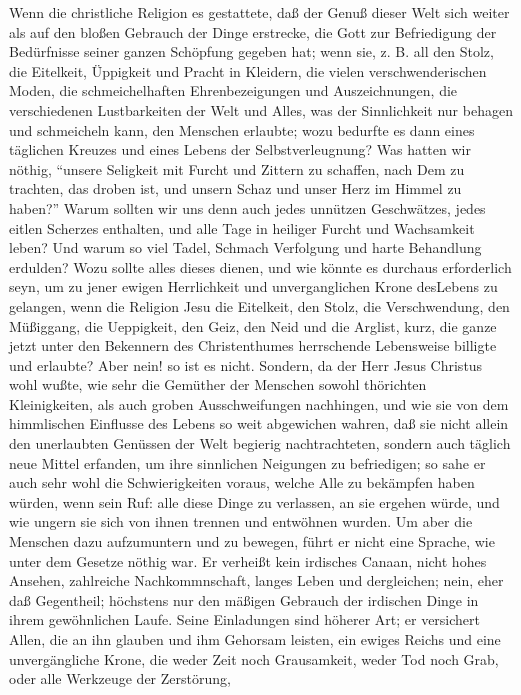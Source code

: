 Wenn die christliche Religion es gestattete, daß der Genuß dieser Welt sich
weiter als auf den bloßen Gebrauch der Dinge erstrecke, die Gott zur
Befriedigung der Bedürfnisse seiner ganzen Schöpfung gegeben hat; wenn sie, z.
B. all den Stolz, die Eitelkeit, Üppigkeit und Pracht in Kleidern, die vielen
verschwenderischen Moden, die schmeichelhaften Ehrenbezeigungen und
Auszeichnungen, die verschiedenen Lustbarkeiten der Welt und Alles, was der
Sinnlichkeit nur behagen und schmeicheln kann, den Menschen erlaubte; wozu
bedurfte es dann eines täglichen Kreuzes und eines Lebens der Selbstverleugnung?
Was hatten wir nöthig, "`unsere Seligkeit mit Furcht und Zittern zu schaffen,
nach Dem zu trachten, das droben ist, und unsern Schaz und unser Herz im Himmel
zu haben?"' Warum sollten wir uns denn auch jedes unnützen Geschwätzes, jedes
eitlen Scherzes enthalten, und alle Tage in heiliger Furcht und Wachsamkeit
leben? Und warum so viel Tadel, Schmach Verfolgung und harte Behandlung
erdulden? Wozu sollte alles dieses dienen, und wie könnte es durchaus
erforderlich seyn, um zu jener ewigen Herrlichkeit und unverganglichen Krone
desLebens zu gelangen, wenn die Religion Jesu die Eitelkeit, den Stolz, die
Verschwendung, den Müßiggang, die Ueppigkeit, den Geiz, den Neid und die
Arglist, kurz, die ganze jetzt unter den Bekennern des Christenthumes
herrschende Lebensweise billigte und erlaubte? Aber nein! so ist es nicht.
Sondern, da der Herr Jesus Christus wohl wußte, wie sehr die Gemüther der
Menschen sowohl thörichten Kleinigkeiten, als auch groben Ausschweifungen
nachhingen, und wie sie von dem himmlischen Einflusse des Lebens so weit
abgewichen wahren, daß sie nicht allein den unerlaubten Genüssen der Welt
begierig nachtrachteten, sondern auch täglich neue Mittel erfanden, um ihre
sinnlichen Neigungen zu befriedigen; so sahe er auch sehr wohl die
Schwierigkeiten voraus, welche Alle zu bekämpfen haben würden, wenn sein Ruf:
alle diese Dinge zu verlassen, an sie ergehen würde, und wie ungern sie sich von
ihnen trennen und entwöhnen wurden. Um aber die Menschen dazu aufzumuntern und
zu bewegen, führt er nicht eine Sprache, wie unter dem Gesetze nöthig war. Er
verheißt kein irdisches Canaan, nicht hohes Ansehen, zahlreiche Nachkommnschaft,
langes Leben und dergleichen; nein, eher daß Gegentheil; höchstens nur den
mäßigen Gebrauch der irdischen Dinge in ihrem gewöhnlichen Laufe. Seine
Einladungen sind höherer Art; er versichert Allen, die an ihn glauben und ihm
Gehorsam leisten, ein ewiges Reichs und eine unvergängliche Krone, die weder
Zeit noch Grausamkeit, weder Tod noch Grab, oder alle Werkzeuge der Zerstörung,
